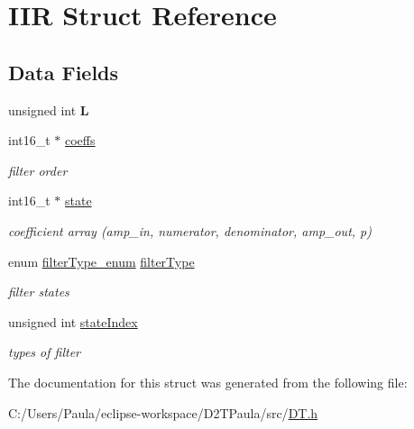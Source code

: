 \hypertarget{struct_i_i_r}{}\section{I\+IR Struct Reference}
\label{struct_i_i_r}
\subsection*{Data Fields}
\begin{DoxyCompactItemize}
\item 
\mbox{\label{struct_i_i_r_a00f543e4037bf6b8a92d4cadf81bedcc}} 
unsigned int {\bfseries L}
\item 
\mbox{\label{struct_i_i_r_a6bd1ae7c9d32618199d5b90297c6edf2}} 
int16\+\_\+t $\ast$ \mbox{\hyperlink{struct_i_i_r_a6bd1ae7c9d32618199d5b90297c6edf2}{coeffs}}
\begin{DoxyCompactList}\small\item\em filter order \end{DoxyCompactList}\item 
\mbox{\label{struct_i_i_r_af99a7d06ab7e855c2c3525584fdc3dc5}} 
int16\+\_\+t $\ast$ \mbox{\hyperlink{struct_i_i_r_af99a7d06ab7e855c2c3525584fdc3dc5}{state}}
\begin{DoxyCompactList}\small\item\em coefficient array (amp\+\_\+in, numerator, denominator, amp\+\_\+out, p) \end{DoxyCompactList}\item 
\mbox{\label{struct_i_i_r_a4b5d902b7f25227e3e03843671bc6a93}} 
enum \mbox{\hyperlink{_d_t_8h_a1ed18b9b39cbafea28f6e34f6d256d35}{filter\+Type\+\_\+enum}} \mbox{\hyperlink{struct_i_i_r_a4b5d902b7f25227e3e03843671bc6a93}{filter\+Type}}
\begin{DoxyCompactList}\small\item\em filter states \end{DoxyCompactList}\item 
\mbox{\label{struct_i_i_r_af907dab8648ebfa5b0b75247fe64d914}} 
unsigned int \mbox{\hyperlink{struct_i_i_r_af907dab8648ebfa5b0b75247fe64d914}{state\+Index}}
\begin{DoxyCompactList}\small\item\em types of filter \end{DoxyCompactList}\end{DoxyCompactItemize}


The documentation for this struct was generated from the following file\+:\begin{DoxyCompactItemize}
\item 
C\+:/\+Users/\+Paula/eclipse-\/workspace/\+D2\+T\+Paula/src/\mbox{\hyperlink{_d_t_8h}{D\+T.\+h}}\end{DoxyCompactItemize}
